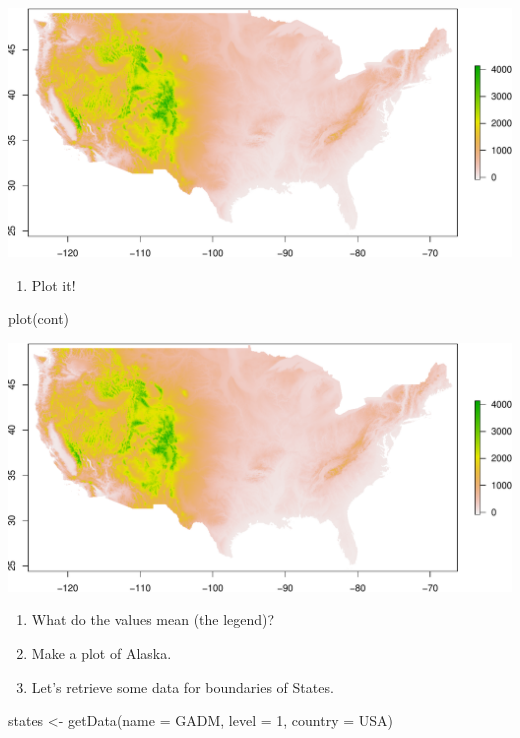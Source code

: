 \documentclass[
]{book}
\newenvironment{Shaded}{\begin{snugshade}}{\end{snugshade}}
\newcommand{\AttributeTok}[1]{\textcolor[rgb]{0.77,0.63,0.00}{#1}}
\newcommand{\DecValTok}[1]{\textcolor[rgb]{0.00,0.00,0.81}{#1}}
\newcommand{\FunctionTok}[1]{\textcolor[rgb]{0.00,0.00,0.00}{#1}}
\newcommand{\NormalTok}[1]{#1}
\newcommand{\OtherTok}[1]{\textcolor[rgb]{0.56,0.35,0.01}{#1}}
\newcommand{\StringTok}[1]{\textcolor[rgb]{0.31,0.60,0.02}{#1}}
\providecommand{\tightlist}{%
  \setlength{\itemsep}{0pt}\setlength{\parskip}{0pt}}
\begin{document}
\includegraphics{figures/unnamed-chunk-416-1.pdf}

\begin{enumerate}
\def\labelenumi{\arabic{enumi}.}
\setcounter{enumi}{6}
\tightlist
\item
  Plot it!
\end{enumerate}

\begin{Shaded}
\begin{Highlighting}[]
\FunctionTok{plot}\NormalTok{(cont)}
\end{Highlighting}
\end{Shaded}

\includegraphics{figures/unnamed-chunk-417-1.pdf}

\begin{enumerate}
\def\labelenumi{\arabic{enumi}.}
\setcounter{enumi}{7}
\item
  What do the values mean (the legend)?
\item
  Make a plot of Alaska.
\item
  Let's retrieve some data for boundaries of States.
\end{enumerate}

\begin{Shaded}
\begin{Highlighting}[]
\NormalTok{states }\OtherTok{\textless{}{-}} \FunctionTok{getData}\NormalTok{(}\AttributeTok{name =} \StringTok{\textquotesingle{}GADM\textquotesingle{}}\NormalTok{, }\AttributeTok{level =} \DecValTok{1}\NormalTok{, }\AttributeTok{country =} \StringTok{\textquotesingle{}USA\textquotesingle{}}\NormalTok{)}
\end{Highlighting}
\end{Shaded}
\end{document}
